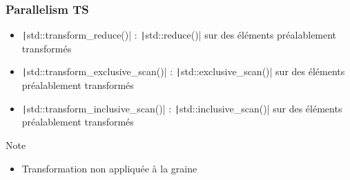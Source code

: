 \documentclass[C++.tex]{subfiles}
\begin{document}
\begin{frame}[fragile]
	\frametitle{Parallelism TS}
	\begin{itemize}
		\item \texttt|std::transform_reduce()| : \texttt|std::reduce()| sur des éléments préalablement transformés
		\item \texttt|std::transform_exclusive_scan()| : \texttt|std::exclusive_scan()| sur des éléments préalablement transformés
		\item \texttt|std::transform_inclusive_scan()| : \texttt|std::inclusive_scan()| sur des éléments préalablement transformés
	\end{itemize}

	\begin{block}{Note}
		\begin{itemize}
			\item Transformation non appliquée à la graine
		\end{itemize}
	\end{block}


\end{frame}
\end{document}
